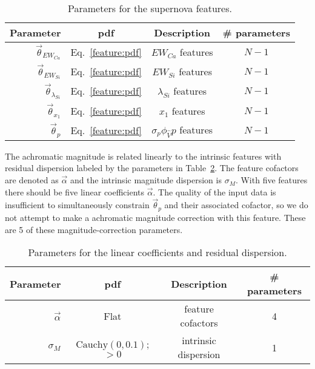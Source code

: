 \documentclass{aastex61}   	%
\begin{document}
\begin{table}
\begin{center}
\caption{Parameters for the supernova features.\label{feature:tab}}
\begin{tabular}{rccc}
\hline
Parameter & pdf & Description & \# parameters\\ \hline
$\vec{\theta}_{EW_{Ca}}$ & Eq.~\ref{feature:pdf} & ${EW}_{Ca}$ features & $N-1$ \\
$\vec{\theta}_{EW_{Si}}$ & Eq.~\ref{feature:pdf}& ${EW}_{Si}$ features & $N-1$ \\
$\vec{\theta}_{\lambda_{Si}}$ &Eq.~\ref{feature:pdf}& ${\lambda}_{Si}$ features & $N-1$ \\
$\vec{\theta}_{x_1}$ & Eq.~\ref{feature:pdf}& ${x}_{1}$ features & $N-1$ \\
$\vec{\theta}_{p}$ & Eq.~\ref{feature:pdf}& $\sigma_p\phi_{\hat{V}}  {p} $ features & $N-1$ \\
\hline
\end{tabular}
\end{center}
\end{table}

The achromatic magnitude is related linearly to the intrinsic features with residual dispersion labeled by the parameters in
Table~\ref{mag:tab}.  The feature cofactors are denoted as $\vec{\alpha}$ and the intrinsic magnitude dispersion
is $\sigma_M$.
With five features there should be five linear coefficients $\vec{\alpha}$.  The quality of the input data is insufficient to
simultaneously constrain $\vec{\theta}_p$ and their associated cofactor, so we do not attempt to make a achromatic magnitude
correction with this feature.
These are 5 of these magnitude-correction parameters.
\begin{table}
\begin{center}
\caption{Parameters for the linear coefficients and residual dispersion.\label{mag:tab}}
\begin{tabular}{rccc}
\hline
Parameter & pdf & Description & \# parameters\\ \hline
$\vec{\alpha}$ & Flat& feature cofactors & 4 \\
$\sigma_M$ & $\text{Cauchy}(0, 0.1)$; $>0$ & intrinsic dispersion & 1\\
\hline
\end{tabular}
\end{center}
\end{table}
\end{document}
